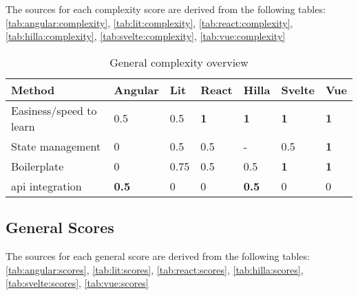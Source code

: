 The sources for each complexity score are derived from the following tables: \autoref{tab:angular:complexity}, \autoref{tab:lit:complexity}, \autoref{tab:react:complexity}, \autoref{tab:hilla:complexity}, \autoref{tab:svelte:complexity}, \autoref{tab:vue:complexity}

\begin{table}[H]
    \centering
    \begin{tabular}{|l|l|l|l|l|l|l|}
        \hline
        \textbf{Method}            & Angular      & Lit  & React      & Hilla        & Svelte     & Vue        \\
        \hline
        Easiness/speed to learn    & 0.5          & 0.5  & \textbf{1} & \textbf{1}   & \textbf{1} & \textbf{1} \\ \hline
        State management           & 0            & 0.5  & 0.5        & -            & 0.5        & \textbf{1} \\ \hline
        Boilerplate                & 0            & 0.75 & 0.5        & 0.5          & \textbf{1} & \textbf{1} \\ \hline
        \acrshort{api} integration & \textbf{0.5} & 0    & 0          & \textbf{0.5} & 0          & 0          \\ \hline
    \end{tabular}
    \caption{General complexity overview}
    \label{tab:conclusion:complexity}
\end{table}

\subsection{General Scores}

The sources for each general score are derived from the following tables: \autoref{tab:angular:scores}, \autoref{tab:lit:scores}, \autoref{tab:react:scores}, \autoref{tab:hilla:scores}, \autoref{tab:svelte:scores}, \autoref{tab:vue:scores}

